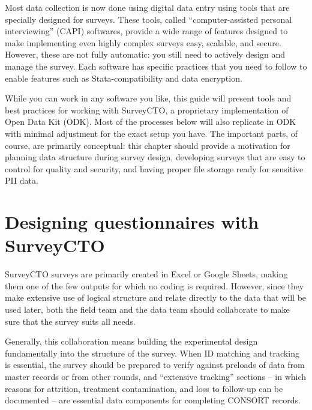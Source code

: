 
\begin{fullwidth}
Most data collection is now done using digital data entry
using tools that are specially designed for surveys.
These tools, called ``computer-assisted personal interviewing'' (CAPI) softwares,
provide a wide range of features designed to make
implementing even highly complex surveys easy, scalable, and secure.
However, these are not fully automatic:
you still need to actively design and manage the survey.
Each software has specific practices that you need to follow
to enable features such as Stata-compatibility and data encryption.

While you can work in any software you like,
this guide will present tools and best practices
for working with SurveyCTO, a proprietary implementation of Open Data Kit (ODK).
Most of the processes below will also replicate in ODK
with minimal adjustment for the exact setup you have.
The important parts, of course, are primarily conceptual:
this chapter should provide a motivation for
planning data structure during survey design,
developing surveys that are easy to control for quality and security,
and having proper file storage ready for sensitive PII data.
\end{fullwidth}


\section{Designing questionnaires with SurveyCTO}

SurveyCTO surveys are primarily created in Excel or Google Sheets,
making them one of the few outputs for which no coding is required.
However, since they make extensive use of logical structure and
relate directly to the data that will be used later,
both the field team and the data team should
collaborate to make sure that the survey suits all needs.\cite{krosnick2018questionnaire}

Generally, this collaboration means building the experimental design
fundamentally into the structure of the survey.
When ID matching and tracking is essential,
the survey should be prepared to verify against preloads
of data from master records or from other rounds,
and ``extensive tracking'' sections --
in which reasons for attrition, treatment contamination, and
loss to follow-up can be documented --
are essential data components for completing CONSORT records.\cite{begg1996improving}

